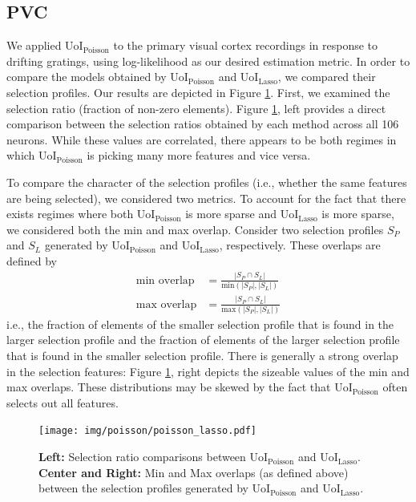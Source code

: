 \documentclass[11pt]{article}
\begin{document}
\subsection{PVC}
We applied UoI$_{\text{Poisson}}$ to the primary visual cortex recordings in response to drifting gratings, using log-likelihood as our desired estimation metric. In order to compare the models obtained by UoI$_{\text{Poisson}}$ and UoI$_{\text{Lasso}}$, we compared their selection profiles. Our results are depicted in Figure \ref{fig:poisson_lasso_comparison}. First, we examined the selection ratio (fraction of non-zero elements). Figure \ref{fig:poisson_lasso_comparison}, left provides a direct comparison between the selection ratios obtained by each method across all 106 neurons. While these values are correlated, there appears to be both regimes in which UoI$_{\text{Poisson}}$ is picking many more features and vice versa.

To compare the character of the selection profiles (i.e., whether the same features are being selected), we considered two metrics. To account for the fact that there exists regimes where both UoI$_{\text{Poisson}}$ is more sparse and UoI$_{\text{Lasso}}$ is more sparse, we considered both the min and max overlap. Consider two selection profiles $S_P$ and $S_L$ generated by UoI$_{\text{Poisson}}$ and UoI$_{\text{Lasso}}$, respectively. These overlaps are defined by
\begin{align}
\text{min overlap} &= \frac{|S_P \cap S_L|}{\text{min} (|S_P|, |S_L|)} \\
\text{max overlap} &=  \frac{|S_P \cap S_L|}{\text{max} (|S_P|, |S_L|)}
\end{align}
i.e., the fraction of elements of the smaller selection profile that is found in the larger selection profile and the fraction of elements of the larger selection profile that is found in the smaller selection profile. There is generally a strong overlap in the selection features: Figure \ref{fig:poisson_lasso_comparison}, right depicts the sizeable values of the min and max overlaps. These distributions may be skewed by the fact that UoI$_{\text{Poisson}}$ often selects out all features.

\begin{figure}[b!]
	\centering
	\texttt{[image: img/poisson/poisson\_lasso.pdf]}
	\caption{\textbf{Left:} Selection ratio comparisons between UoI$_{\text{Poisson}}$ and UoI$_{\text{Lasso}}$. \textbf{Center and Right:} Min and Max overlaps (as defined above) between the selection profiles generated by UoI$_{\text{Poisson}}$ and UoI$_{\text{Lasso}}$.}
	\label{fig:poisson_lasso_comparison}
\end{figure}
\end{document}
